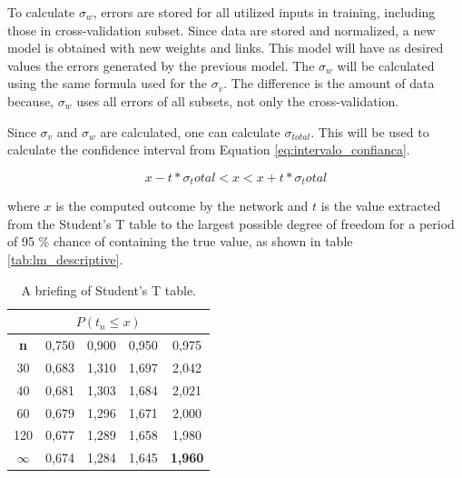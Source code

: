 To calculate $\sigma_w$, errors are stored for all utilized inputs in training, including those in cross-validation subset. Since data are stored and normalized, a new model is obtained with new weights and links. This model will have as desired values the errors generated by the previous model. The $\sigma_w$ will be calculated using the same formula used for the $\sigma_v$. The difference is the amount of data because, $\sigma_w$ uses all errors of all subsets, not only the cross-validation.

Since $\sigma_v$ and $\sigma_w$ are calculated, one can calculate $\sigma_{total}$. This will be used to calculate the confidence interval from Equation \ref{eq:intervalo_confianca}.

\begin{equation}
\label{eq:intervalo_confianca}
x - t * \sigma_total < x < x + t * \sigma_total
\end{equation}

where $x$ is the computed outcome by the network and $t$ is the value extracted from the Student's T table to the largest possible degree of freedom for a period of 95 \% chance of containing the true value, as shown in table \ref{tab:lm_descriptive}.

\begin{table}[h]
\caption{A briefing of Student's T table.}\label{tab:t-student} \centering
\begin{tabular}{|c|c|c|c|c|}
  \hline
  \multicolumn{5}{|c|}{$P(t_n \leq x)$}  \\
  \hline
  \textbf{n} & 0,750 & 0,900 & 0,950 & 0,975  \\
  \hline
  30 & 0,683 & 1,310 & 1,697 & 2,042   \\
  \hline
  40 & 0,681 & 1,303 & 1,684 & 2,021   \\
  \hline
  60 & 0,679 & 1,296 & 1,671 & 2,000   \\
  \hline
  120 & 0,677 & 1,289 & 1,658 & 1,980   \\
  \hline
  $\infty$ & 0,674 & 1,284 & 1,645 & \textbf{1,960}   \\
  \hline
\end{tabular}
\end{table}

\pagebreak
